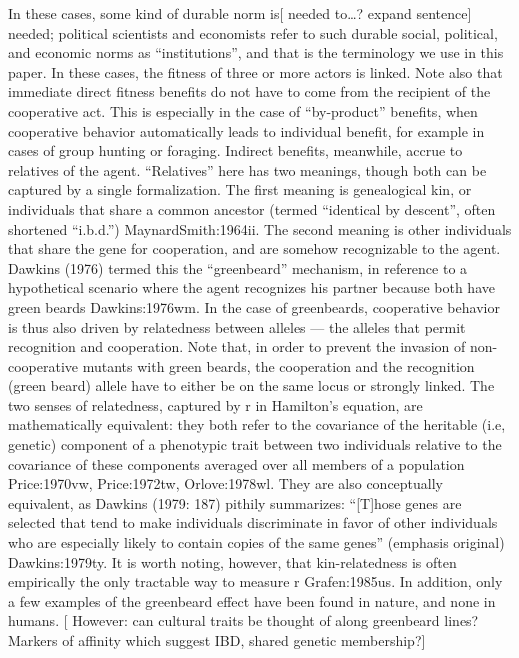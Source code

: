 \documentclass{tufte-book} %
\begin{document}
In these cases, some kind of durable norm is[ needed to…? expand sentence] needed; political scientists and economists refer to such durable social, political, and economic norms as “institutions”, and that is the terminology we use in this paper. In these cases, the fitness of three or more actors is linked. Note also that immediate direct fitness benefits do not have to come from the recipient of the cooperative act. This is especially in the case of “by-product” benefits, when cooperative behavior automatically leads to individual benefit, for example in cases of group hunting or foraging.
Indirect benefits, meanwhile, accrue to relatives of the agent. “Relatives” here has two meanings, though both can be captured by a single formalization. The first meaning is genealogical kin, or individuals that share a common ancestor (termed “identical by descent”, often shortened “i.b.d.”) {MaynardSmith:1964ii}. The second meaning is other individuals that share the gene for cooperation, and are somehow recognizable to the agent. Dawkins (1976) termed this the “greenbeard” mechanism, in reference to a hypothetical scenario where the agent recognizes his partner because both have green beards {Dawkins:1976wm}. In the case of greenbeards, cooperative behavior is thus also driven by relatedness between alleles — the alleles that permit recognition and cooperation. Note that, in order to prevent the invasion of non-cooperative mutants with green beards, the cooperation and the recognition (green beard) allele have to either be on the same locus or strongly linked.
The two senses of relatedness, captured by r in Hamilton’s equation, are mathematically equivalent: they both refer to the covariance of the heritable (i.e, genetic) component of a phenotypic trait between two individuals relative to the covariance of these components averaged over all members of a population {Price:1970vw, Price:1972tw, Orlove:1978wl}. They are also conceptually equivalent, as Dawkins (1979: 187) pithily summarizes: “[T]hose genes are selected that tend to make individuals discriminate in favor of other individuals who are especially likely to contain copies of the same genes” (emphasis original) {Dawkins:1979ty}. It is worth noting, however, that kin-relatedness is often empirically the only tractable way to measure r {Grafen:1985us}. In addition, only a few examples of the greenbeard effect have been found in nature, and none in humans. [ However: can cultural traits be thought of along greenbeard lines? Markers of affinity which suggest IBD, shared genetic membership?]
\end{document}
